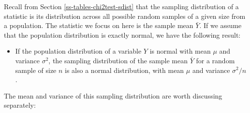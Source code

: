 \documentclass[11pt,a4paper,openany]{book}
\providecommand{\tightlist}{%
  \setlength{\itemsep}{0pt}\setlength{\parskip}{0pt}}
\begin{document}
Recall from Section \ref{ss-tables-chi2test-sdist} that the sampling
distribution of a statistic is its distribution across all possible
random samples of a given size from a population. The statistic we focus
on here is the sample mean \(\bar{Y}\). If we assume that the population
distribution is exactly normal, we have the following result:

\begin{itemize}
\tightlist
\item
  If the population distribution of a variable \(Y\) is normal with mean
  \(\mu\) and variance \(\sigma^{2}\), the sampling distribution of the
  sample mean \(\bar{Y}\) for a random sample of size \(n\) is also a
  normal distribution, with mean \(\mu\) and variance \(\sigma^{2}/n\).
\end{itemize}

The mean and variance of this sampling distribution are worth discussing
separately:
\end{document}
